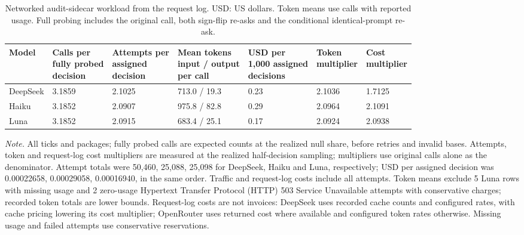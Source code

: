 \begin{table}[tbp]
\caption{Networked audit-sidecar workload from the request log. USD: US dollars. Token means use calls with reported usage. Full probing includes the original call, both sign-flip re-asks and the conditional identical-prompt re-ask.}
\label{tab:workload}
\centering\footnotesize
\setlength{\tabcolsep}{3pt}
\renewcommand{\arraystretch}{1.0}
\begin{tabularx}{\linewidth}{@{}lXXXXXX@{}}
\toprule
Model & \shortstack[l]{Calls per\\{}fully probed\\{}decision} & \shortstack[l]{Attempts per\\{}assigned\\{}decision} & \shortstack[l]{Mean tokens\\{}input / output\\{}per call} & \shortstack[l]{USD per\\{}1,000 assigned\\{}decisions} & \shortstack[l]{Token\\{}multiplier} & \shortstack[l]{Cost\\{}multiplier} \\
\midrule
DeepSeek & 3.1859 & 2.1025 & 713.0 / 19.3 & 0.23 & 2.1036 & 1.7125 \\
Haiku & 3.1852 & 2.0907 & 975.8 / 82.8 & 0.29 & 2.0964 & 2.1091 \\
Luna & 3.1852 & 2.0915 & 683.4 / 25.1 & 0.17 & 2.0924 & 2.0938 \\
\bottomrule
\end{tabularx}
\par\smallskip\raggedright\textit{Note.} All ticks and packages; fully probed calls are expected counts at the realized null share, before retries and invalid bases. Attempts, token and request-log cost multipliers are measured at the realized half-decision sampling; multipliers use original calls alone as the denominator. Attempt totals were 50,460, 25,088, 25,098 for DeepSeek, Haiku and Luna, respectively; USD per assigned decision was 0.00022658, 0.00029058, 0.00016940, in the same order. Traffic and request-log costs include all attempts. Token means exclude 5 Luna rows with missing usage and 2 zero-usage Hypertext Transfer Protocol (HTTP) 503 Service Unavailable attempts with conservative charges; recorded token totals are lower bounds. Request-log costs are not invoices: DeepSeek uses recorded cache counts and configured rates, with cache pricing lowering its cost multiplier; OpenRouter uses returned cost where available and configured token rates otherwise. Missing usage and failed attempts use conservative reservations.\par
\end{table}
